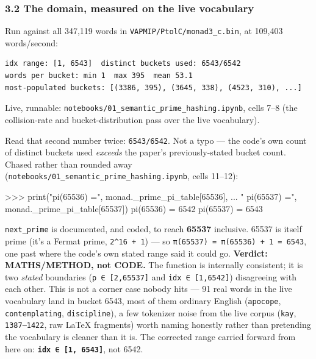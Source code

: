 \documentclass[
  10pt,
]{article}
\newenvironment{Shaded}{}{}
\newcommand{\BuiltInTok}[1]{\textcolor[rgb]{0.00,0.50,0.00}{#1}}
\newcommand{\DecValTok}[1]{\textcolor[rgb]{0.25,0.63,0.44}{#1}}
\newcommand{\NormalTok}[1]{#1}
\newcommand{\OperatorTok}[1]{\textcolor[rgb]{0.40,0.40,0.40}{#1}}
\newcommand{\StringTok}[1]{\textcolor[rgb]{0.25,0.44,0.63}{#1}}
\begin{document}
\hypertarget{the-domain-measured-on-the-live-vocabulary}{%
\subsubsection{3.2 The domain, measured on the live
vocabulary}\label{the-domain-measured-on-the-live-vocabulary}}

Run against all 347,119 words in \texttt{VAPMIP/PtolC/monad3\_c.bin}, at
109,403 words/second:

\begin{verbatim}
idx range: [1, 6543]  distinct buckets used: 6543/6542
words per bucket: min 1  max 395  mean 53.1
most-populated buckets: [(3386, 395), (3645, 338), (4523, 310), ...]
\end{verbatim}

Live, runnable: \texttt{notebooks/01\_semantic\_prime\_hashing.ipynb},
cells 7--8 (the collision-rate and bucket-distribution pass over the
live vocabulary).

Read that second number twice: \texttt{6543/6542}. Not a typo --- the
code's own count of distinct buckets used \emph{exceeds} the paper's
previously-stated bucket count. Chased rather than rounded away
(\texttt{notebooks/01\_semantic\_prime\_hashing.ipynb}, cells 11--12):

\begin{Shaded}
\begin{Highlighting}[]
\OperatorTok{\textgreater{}\textgreater{}\textgreater{}} \BuiltInTok{print}\NormalTok{(}\StringTok{"pi(65536) ="}\NormalTok{, monad.\_prime\_pi\_table[}\DecValTok{65536}\NormalTok{],}
\NormalTok{...       }\StringTok{" pi(65537) ="}\NormalTok{, monad.\_prime\_pi\_table[}\DecValTok{65537}\NormalTok{])}
\NormalTok{pi(}\DecValTok{65536}\NormalTok{) }\OperatorTok{=} \DecValTok{6542}\NormalTok{   pi(}\DecValTok{65537}\NormalTok{) }\OperatorTok{=} \DecValTok{6543}
\end{Highlighting}
\end{Shaded}

\texttt{next\_prime} is documented, and coded, to reach \textbf{65537}
inclusive. 65537 is itself prime (it's a Fermat prime,
\texttt{2\^{}16\ +\ 1}) --- so
\texttt{π(65537)\ =\ π(65536)\ +\ 1\ =\ 6543}, one past where the code's
own stated range said it could go. \textbf{Verdict: MATHS/METHOD, not
CODE.} The function is internally consistent; it is two \emph{stated}
boundaries (\texttt{p\ ∈\ {[}2,65537{]}} and
\texttt{idx\ ∈\ {[}1,6542{]}}) disagreeing with each other. This is not
a corner case nobody hits --- 91 real words in the live vocabulary land
in bucket 6543, most of them ordinary English (\texttt{apocope},
\texttt{contemplating}, \texttt{discipline}), a few tokenizer noise from
the live corpus (\texttt{\textquotesingle{}kay}, \texttt{1387–1422}, raw
LaTeX fragments) worth naming honestly rather than pretending the
vocabulary is cleaner than it is. The corrected range carried forward
from here on: \textbf{\texttt{idx\ ∈\ {[}1,\ 6543{]}}}, not 6542.
\end{document}
